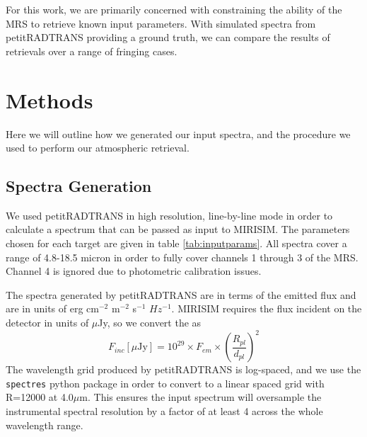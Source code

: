 For this work, we are primarily concerned with constraining the ability of the MRS to retrieve known input parameters. 
With simulated spectra from petitRADTRANS providing a ground truth, we can compare the results of retrievals over a range of fringing cases.
\section{Methods}
Here we will outline how we generated our input spectra, and the procedure we used to perform our atmospheric retrieval.
\subsection{Spectra Generation}
We used petitRADTRANS in high resolution, line-by-line mode in order to calculate a spectrum that can be passed as input to MIRISIM.
The parameters chosen for each target are given in table \ref{tab:inputparams}. 
All spectra cover a range of 4.8-18.5 micron in order to fully cover channels 1 through 3 of the MRS. 
Channel 4 is ignored due to photometric calibration issues.

The spectra generated by petitRADTRANS are in terms of the emitted flux and are in units of erg cm$^{-2}$ m$^{-2}$ s$^{-1}$ $Hz^{-1}$. 
MIRISIM requires the flux incident on the detector in units of $\mu$Jy, so we convert the as 
\begin{equation}
F_{inc} [\mu\textrm{Jy}] = 10^{29}\times F_{em} \times \left(\frac{R_{pl}}{d_{pl}}\right)^{2}
\end{equation}
The wavelength grid produced by petitRADTRANS is log-spaced, and we use the \verb|spectres| python package \parencite{Carnall2017} in order to convert to a linear spaced grid with R=12000 at 4.0$\mu$m. 
This ensures the input spectrum will oversample the instrumental spectral resolution by a factor of at least 4 across the whole wavelength range.

